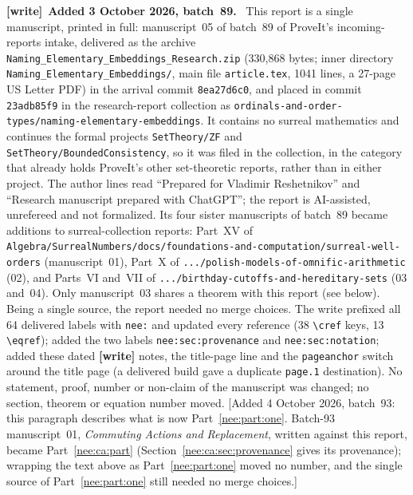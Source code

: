 \documentclass[11pt,letterpaper]{article}
\numberwithin{equation}{section}
\theoremstyle{plain}
\theoremstyle{definition}
\theoremstyle{remark}
\newenvironment{writenote}[1][]{\par\smallskip\begingroup\small\raggedright
 \setlength{\parindent}{1.25em}\noindent\textbf{[write]}\if\relax\detokenize{#1}\relax\else~\textbf{#1.}\fi\ }%
 {\par\endgroup\smallskip}
\begin{document}
\begin{writenote}[Added 3 October 2026, batch~89]
This report is a single manuscript, printed in full: manuscript~05 of batch~89 of ProveIt's incoming-reports intake, delivered as the archive \texttt{Naming\_\allowbreak Elementary\_\allowbreak Embeddings\_\allowbreak Research.zip} (330,868 bytes; inner directory \texttt{Naming\_\allowbreak Elementary\_\allowbreak Embeddings/}, main file \texttt{article.tex}, 1041 lines, a 27-page US Letter PDF) in the arrival commit \texttt{8ea27d6c0}, and placed in commit \texttt{23adb85f9} in the research-report collection as \texttt{ordinals-and-order-types/\allowbreak naming-elementary-embeddings}. It contains no surreal mathematics and continues the formal projects \nolinkurl{SetTheory/ZF} and \nolinkurl{SetTheory/BoundedConsistency}, so it was filed in the collection, in the category that already holds ProveIt's other set-theoretic reports, rather than in either project. The author lines read ``Prepared for Vladimir Reshetnikov'' and ``Research manuscript prepared with ChatGPT''; the report is AI-assisted, unrefereed and not formalized. Its four sister manuscripts of batch~89 became additions to surreal-collection reports: Part~XV of \nolinkurl{Algebra/SurrealNumbers/docs/foundations-and-computation/surreal-well-orders} (manuscript~01), Part~X of \nolinkurl{.../polish-models-of-omnific-arithmetic} (02), and Parts~VI and~VII of \nolinkurl{.../birthday-cutoffs-and-hereditary-sets} (03 and~04). Only manuscript~03 shares a theorem with this report (see below). Being a single source, the report needed no merge choices. The write prefixed all 64 delivered labels with \texttt{nee:} and updated every reference (38 \verb|\cref| keys, 13 \verb|\eqref|); added the two labels \texttt{nee:sec:provenance} and \texttt{nee:sec:notation}; added these dated \textbf{[write]} notes, the title-page line and the \texttt{pageanchor} switch around the title page (a delivered build gave a duplicate \texttt{page.1} destination). No statement, proof, number or non-claim of the manuscript was changed; no section, theorem or equation number moved. [Added 4 October 2026, batch~93: this paragraph describes what is now Part~\ref{nee:part:one}. Batch-93 manuscript~01, \emph{Commuting Actions and Replacement}, written against this report, became Part~\ref{nee:ca:part} (Section~\ref{nee:ca:sec:provenance} gives its provenance); wrapping the text above as Part~\ref{nee:part:one} moved no number, and the single source of Part~\ref{nee:part:one} still needed no merge choices.]


\end{writenote}
\end{document}

